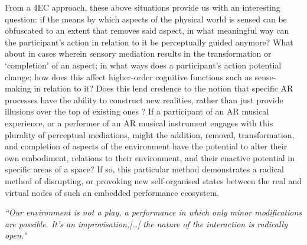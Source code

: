 From a 4EC approach, these above situations provide us with an interesting question: if the means by which aspects of the physical world is sensed can be obfuscated to an extent that removes said aspect, in what meaningful way can the participant’s action in relation to it be perceptually guided anymore? What about in cases wherein sensory mediation results in the transformation or ‘completion’ of an aspect; in what ways does a participant’s action potential change; how does this affect higher-order cognitive functions such as sense-making in relation to it? Does this lend credence to the notion that specific AR processes have the ability to construct new realities, rather than just provide illusions over the top of existing ones \citep[p. 230]{chalmers2022}? If a participant of an AR musical experience, or a performer of an AR musical instrument engages with this plurality of perceptual mediations, might the addition, removal, transformation, and completion of aspects of the environment have the potential to alter their own embodiment, relations to their environment, and their enactive potential in specific areas of a space? If so, this particular method demonstrates a radical method of disrupting, or provoking new self-organised states between the real and virtual nodes of such an embedded performance ecosystem.



\epigraph{\emph{“Our environment is not a play, a performance in which only minor modifications are possible. It’s an improvisation,[…] the nature of the interaction is radically open.”}}{\citep[]{vermeulen2015}}

